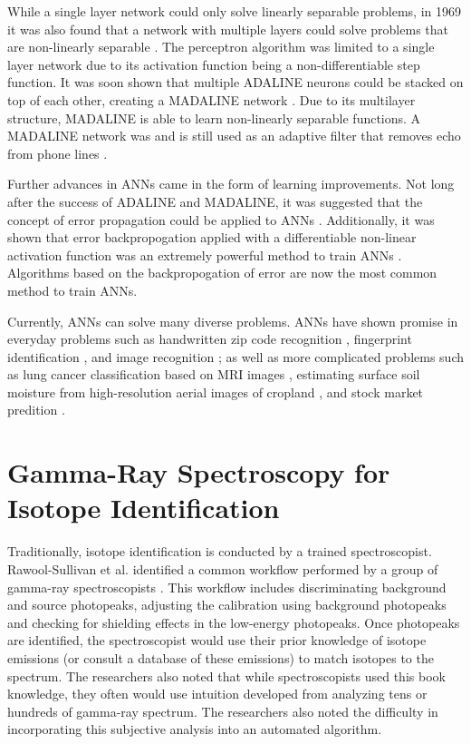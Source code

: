 While a single layer network could only solve linearly separable problems, in 1969 it was also found that a network with multiple layers could solve problems that are non-linearly separable \cite{Minsky1969}. The perceptron algorithm was limited to a single layer network due to its activation function being a non-differentiable step function. It was soon shown that multiple ADALINE neurons could be stacked on top of each other, creating a MADALINE network \cite{Ridgway1962}. Due to its multilayer structure, MADALINE is able to learn non-linearly separable functions. A MADALINE network was and is still used as an adaptive filter that removes echo from phone lines \cite{Widrow1988}.

Further advances in ANNs came in the form of learning improvements. Not long after the success of ADALINE and MADALINE, it was suggested that the concept of error propagation could be applied to ANNs \cite{Werbos1974, Rumelhart1986}. Additionally, it was shown that error backpropogation applied with a differentiable non-linear activation function was an extremely powerful method to train ANNs \cite{Murtagh1991}. Algorithms based on the backpropogation of error are now the most common method to train ANNs.

Currently, ANNs can solve many diverse problems. ANNs have shown promise in everyday problems such as handwritten zip code recognition \cite{LeCun1989}, fingerprint identification \cite{Jeyanthia2015}, and image recognition \cite{Krizhevsky2012}; as well as more complicated problems such as lung cancer classification based on MRI images \cite{Selvakumari2016}, estimating surface soil moisture from high-resolution aerial images of cropland \cite{Hassan-Esfahani2015}, and stock market predition \cite{Rababaah2015}.


\section{Gamma-Ray Spectroscopy for Isotope Identification}

Traditionally, isotope identification is conducted by a trained spectroscopist. Rawool-Sullivan et al. identified a common workflow performed by a group of gamma-ray spectroscopists \cite{Sullivan2010}. This workflow includes discriminating background and source photopeaks, adjusting the calibration using background photopeaks and checking for shielding effects in the low-energy photopeaks. Once photopeaks are identified, the spectroscopist would use their prior knowledge of isotope emissions (or consult a database of these emissions) to match isotopes to the spectrum. The researchers also noted that while  spectroscopists used this book knowledge, they often would use intuition developed from analyzing tens or hundreds of gamma-ray spectrum. The researchers also noted the difficulty in incorporating this subjective analysis into an automated algorithm.


